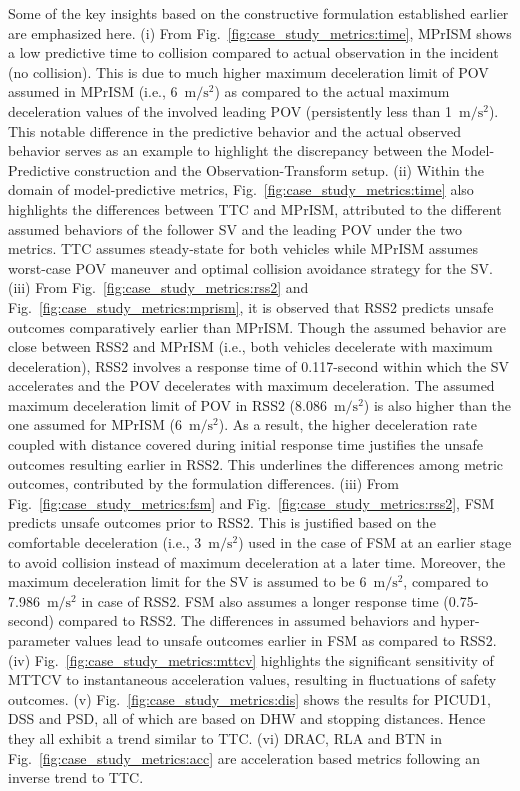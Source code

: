 \documentclass[journal]{IEEEtran}
\begin{document}
Some of the key insights based on the constructive formulation established earlier are emphasized here. (i) From Fig.~\ref{fig:case_study_metrics:time}, MPrISM shows a low predictive time to collision compared to actual observation in the incident (no collision). This is due to much higher maximum deceleration limit of POV assumed in MPrISM (i.e., 6~$\mathrm{m/s^2}$) as compared to the actual maximum deceleration values of the involved leading POV (persistently less than 1~$\mathrm{m/s^2}$). This notable difference in the predictive behavior and the actual observed behavior serves as an example to highlight the discrepancy between the Model-Predictive construction and the Observation-Transform setup. (ii) Within the domain of model-predictive metrics, Fig.~\ref{fig:case_study_metrics:time} also highlights the differences between TTC and MPrISM, attributed to the different assumed behaviors of the follower SV and the leading POV under the two metrics. TTC assumes steady-state for both vehicles while MPrISM assumes worst-case POV maneuver and optimal collision avoidance strategy for the SV. (iii) From Fig.~\ref{fig:case_study_metrics:rss2} and Fig.~\ref{fig:case_study_metrics:mprism}, it is observed that RSS2 predicts unsafe outcomes comparatively earlier than MPrISM. Though the assumed behavior are close between RSS2 and MPrISM (i.e., both vehicles decelerate with maximum deceleration), RSS2 involves a response time of 0.117-second within which the SV accelerates and the POV decelerates with maximum deceleration. The assumed maximum deceleration limit of POV in RSS2 (8.086~$\mathrm{m/s^2}$) is also higher than the one assumed for MPrISM (6~$\mathrm{m/s^2}$). As a result, the higher deceleration rate coupled with distance covered during initial response time justifies the unsafe outcomes resulting earlier in RSS2. This underlines the differences among metric outcomes, contributed by the formulation differences. (iii) From Fig.~\ref{fig:case_study_metrics:fsm} and Fig.~\ref{fig:case_study_metrics:rss2}, FSM predicts unsafe outcomes prior to RSS2. This is justified based on the comfortable deceleration (i.e., 3~$\mathrm{m/s^2}$) used in the case of FSM at an earlier stage to avoid collision instead of maximum deceleration at a later time. Moreover, the maximum deceleration limit for the SV is assumed to be 6~$\mathrm{m/s^2}$, compared to 7.986~$\mathrm{m/s^2}$ in case of RSS2. FSM also assumes a longer response time (0.75-second) compared to RSS2. The differences in assumed behaviors and hyper-parameter values lead to unsafe outcomes earlier in FSM as compared to RSS2. (iv) Fig.~\ref{fig:case_study_metrics:mttcv} highlights the significant sensitivity of MTTCV to instantaneous acceleration values, resulting in fluctuations of safety outcomes. (v) Fig.~\ref{fig:case_study_metrics:dis} shows the results for PICUD1, DSS and PSD, all of which are based on DHW and stopping distances. Hence they all exhibit a trend similar to TTC. (vi) DRAC, RLA and BTN in Fig.~\ref{fig:case_study_metrics:acc} are acceleration based metrics following an inverse trend to TTC.
\end{document}

